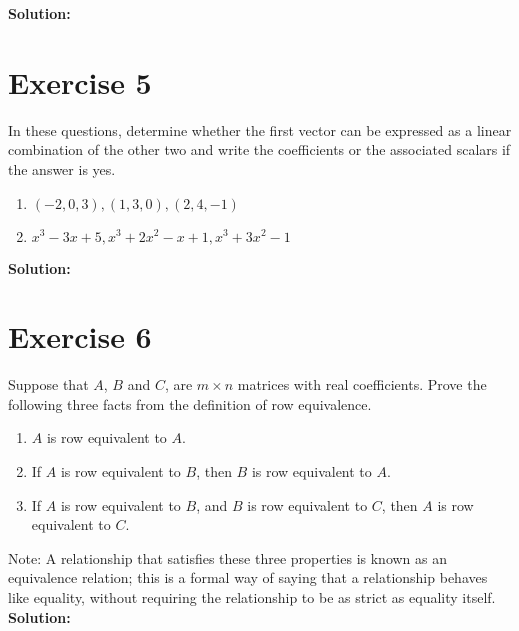 \documentclass{article}
\begin{document}
\textbf{Solution:}
\newpage

\section*{Exercise 5}
In these questions, determine whether the first vector can be expressed as a linear combination of the other two and write the coefficients or the associated scalars if the answer is yes.
\begin{enumerate}[label=(\alph*)]
\item $(-2,0,3),(1,3,0),(2,4,-1)$
\item $x^3 - 3x + 5, x^3 + 2x^2 - x + 1, x^3 + 3x^2 - 1$
\end{enumerate}

\textbf{Solution:}
\newpage

\section*{Exercise 6}
Suppose that $A$, $B$ and $C$, are $m \times n$ matrices with real coefficients. Prove the following three facts from the definition of row equivalence.
\begin{enumerate}[label=(\alph*)]
\item $A$ is row equivalent to $A$.
\item If $A$ is row equivalent to $B$, then $B$ is row equivalent to $A$.
\item If $A$ is row equivalent to $B$, and $B$ is row equivalent to $C$, then $A$ is row equivalent to $C$.
\end{enumerate}
Note: A relationship that satisfies these three properties is known as an equivalence relation; this is a formal way of saying that a relationship behaves like equality, without requiring the relationship to be as strict as equality itself. \\

\textbf{Solution:}
\end{document}
